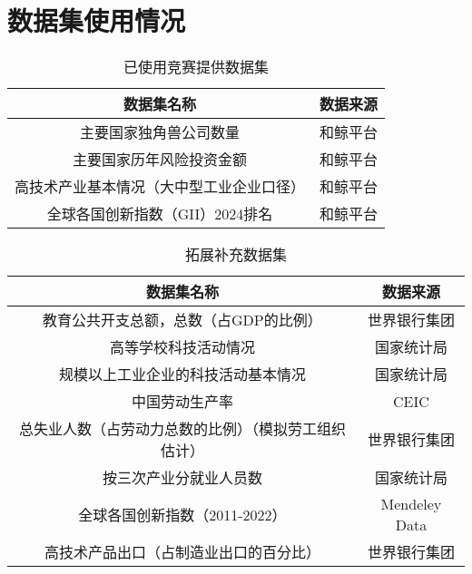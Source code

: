 \chapter{数据集使用情况}
\label{chapter:dataset}

\begin{table}[H]
\caption{已使用竞赛提供数据集}
\centering
\begin{tabular}{cc}
\hline
\hline
\textbf{数据集名称} &\textbf{数据来源}\\
\hline
主要国家独角兽公司数量 & 和鲸平台\\
主要国家历年风险投资金额   & 和鲸平台\\
高技术产业基本情况（大中型工业企业口径） & 和鲸平台\\
全球各国创新指数（GII）2024排名 & 和鲸平台\\
\hline
\end{tabular}
\end{table}

\begin{table}[H]
\caption{拓展补充数据集}
\centering
\begin{tabular}{cc}
\hline
\hline
\textbf{数据集名称} &\textbf{数据来源}\\
\hline
教育公共开支总额，总数（占GDP的比例） & 世界银行集团\\
高等学校科技活动情况 & 国家统计局\\
规模以上工业企业的科技活动基本情况  & 国家统计局\\
中国劳动生产率 & CEIC\\
总失业人数（占劳动力总数的比例）（模拟劳工组织估计） & 世界银行集团\\
按三次产业分就业人员数 & 国家统计局\\
全球各国创新指数（2011-2022） & Mendeley Data\\
高技术产品出口（占制造业出口的百分比） & 世界银行集团\\
\hline
\end{tabular}
\end{table}